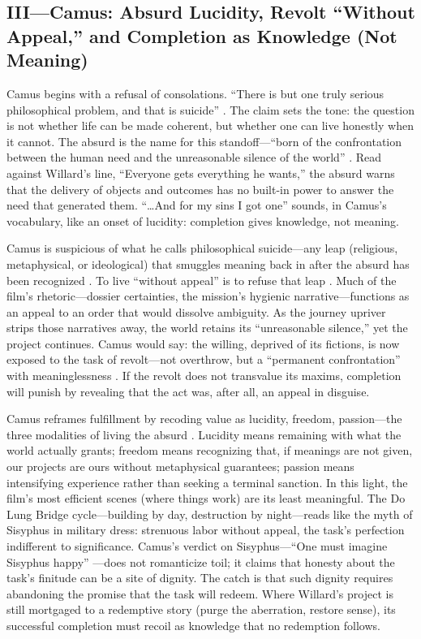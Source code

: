 \subsection*{III—Camus: Absurd Lucidity, Revolt ``Without Appeal,'' and Completion as Knowledge
	(Not Meaning)}
\label{ssec:iii-camus}
Camus begins with a refusal of consolations. ``There is but one truly serious philosophical
problem, and that is suicide'' \parencite[p.~3]{CamusMyth1991}. The claim sets the tone: the
question is not whether life can be made coherent, but whether one can live honestly when it
cannot. The absurd is the name for this standoff—``born of the confrontation between the human
need and the unreasonable silence of the world'' \parencite[p.~28]{CamusMyth1991}. Read against
Willard's line, ``Everyone gets everything he wants,'' the absurd warns that the delivery of
objects and outcomes has no built-in power to answer the need that generated them. ``\ldots And
for my sins I got one'' sounds, in Camus's vocabulary, like an onset of lucidity: completion
gives knowledge, not meaning.

Camus is suspicious of what he calls philosophical suicide—any leap (religious, metaphysical,
or ideological) that smuggles meaning back in after the absurd has been recognized
\parencite[pp.~53--58]{CamusMyth1991}. To live ``without appeal'' is to refuse that leap
\parencite[p.~54]{CamusMyth1991}. Much of the film's rhetoric—dossier certainties, the mission's
hygienic narrative—functions as an appeal to an order that would dissolve ambiguity. As the
journey upriver strips those narratives away, the world retains its ``unreasonable silence,''
yet the project continues. Camus would say: the willing, deprived of its fictions, is now
exposed to the task of revolt—not overthrow, but a ``permanent confrontation'' with
meaninglessness \parencite[p.~55]{CamusMyth1991}. If the revolt does not transvalue its maxims,
completion will punish by revealing that the act was, after all, an appeal in disguise.

Camus reframes fulfillment by recoding value as lucidity, freedom, passion—the three modalities
of living the absurd \parencite[pp.~54--71]{CamusMyth1991}. Lucidity means remaining with what
the world actually grants; freedom means recognizing that, if meanings are not given, our
projects are ours without metaphysical guarantees; passion means intensifying experience rather
than seeking a terminal sanction. In this light, the film's most efficient scenes (where things
work) are its least meaningful. The Do Lung Bridge cycle—building by day, destruction by
night—reads like the myth of Sisyphus in military dress: strenuous labor without appeal, the
task's perfection indifferent to significance. Camus's verdict on Sisyphus—``One must imagine
Sisyphus happy'' \parencite[p.~123]{CamusMyth1991}—does not romanticize toil; it claims that
honesty about the task's finitude can be a site of dignity. The catch is that such dignity
requires abandoning the promise that the task will redeem. Where Willard's project is still
mortgaged to a redemptive story (purge the aberration, restore sense), its successful completion
must recoil as knowledge that no redemption follows.

